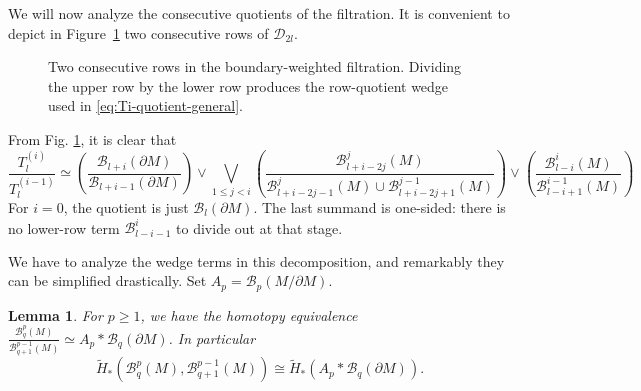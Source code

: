 \documentclass[11pt,a4paper]{article}
\numberwithin{equation}{section}
\newtheorem{lem}[thm]{Lemma}
\theoremstyle{definition}
\theoremstyle{remark}
\newcommand{\pa}{\partial}
\newcommand{\wt}{\widetilde}
\newcommand{\BB}{\mathcal B}
\begin{document}
We will now analyze the consecutive quotients of the filtration.
It is convenient to depict in Figure~\ref{fig:two-row-quotient} two consecutive rows of $\mathcal D_{2l}$. 
\begin{figure}[htbp]
\centering
{}
\caption{Two consecutive rows in the boundary-weighted filtration.  Dividing the upper row by the lower row produces the row-quotient wedge used in \eqref{eq:Ti-quotient-general}.}
\label{fig:two-row-quotient}
\end{figure}
From Fig. \ref{fig:two-row-quotient}, it is clear that 
\begin{equation}\label{eq:Ti-quotient-general} \frac{T_l^{(i)}}{T_l^{(i-1)}}\simeq\left(\frac{\BB_{l+i}(\pa M)}{\BB_{l+i-1}(\pa M)}\right)
\vee\bigvee_{1\le j<i}
\left(
\frac{\BB_{l+i-2j}^{j}(M)}
{\BB_{l+i-2j-1}^{j}(M)\cup\BB_{l+i-2j+1}^{j-1}(M)}
\right)
\vee\left(
\frac{\BB_{l-i}^{i}(M)}{\BB_{l-i+1}^{i-1}(M)}
\right)
\end{equation}
For \(i=0\), the quotient is just \(\BB_l(\pa M)\).  The last summand is one-sided: there is no lower-row term \(\BB_{l-i-1}^{i}\) to divide out at that stage.

We have to analyze the wedge terms in this decomposition, and remarkably they can be simplified drastically. Set $A_p = \BB_p(M/\partial M)$.

\begin{lem}\label{lem:row-quotient-splitting}
For $p\geq 1$, we have the homotopy equivalence 
$\displaystyle\frac{\BB_q^p(M)}{\BB_{q+1}^{p-1}(M)} 
\simeq 
A_p*\BB_q(\pa M)$.
In particular
$$\displaystyle 
\wt H_*\left(\BB_q^p(M), \BB_{q+1}^{p-1}(M)\right)
\cong
\wt H_*(A_p*\BB_q(\pa M)).
$$
\end{lem} 
\end{document}
